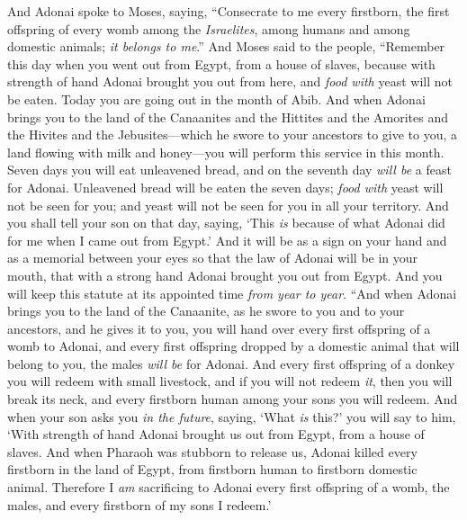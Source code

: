 \begin{biblechapter} %
 And Adonai spoke to Moses, saying,
\verse “Consecrate to me every firstborn, the first offspring of every womb among the \textit{Israelites}, among humans and among domestic animals; \textit{it belongs to me}.”
\verse And Moses said to the people, “Remember this day when you went out from Egypt, from a house of slaves, because with strength of hand Adonai brought you out from here, and \textit{food with} yeast will not be eaten.
\verse Today you are going out in the month of Abib.
\verse And when Adonai brings you to the land of the Canaanites and the Hittites and the Amorites and the Hivites and the Jebusites—which he swore to your ancestors to give to you, a land flowing with milk and honey—you will perform this service in this month.
\verse Seven days you will eat unleavened bread, and on the seventh day \textit{will be} a feast for Adonai.
\verse Unleavened bread will be eaten the seven days; \textit{food with} yeast will not be seen for you; and yeast will not be seen for you in all your territory.
\verse And you shall tell your son on that day, saying, ‘This \textit{is} because of what Adonai did for me when I came out from Egypt.’
\verse And it will be as a sign on your hand and as a memorial between your eyes so that the law of Adonai will be in your mouth, that with a strong hand Adonai brought you out from Egypt.
\verse And you will keep this statute at its appointed time \textit{from year to year}.
\verse “And when Adonai brings you to the land of the Canaanite, as he swore to you and to your ancestors, and he gives it to you,
\verse you will hand over every first offspring of a womb to Adonai, and every first offspring dropped by a domestic animal that will belong to you, the males \textit{will be} for Adonai.
\verse And every first offspring of a donkey you will redeem with small livestock, and if you will not redeem \textit{it}, then you will break its neck, and every firstborn human among your sons you will redeem.
\verse And when your son asks you \textit{in the future}, saying, ‘What \textit{is} this?’ you will say to him, ‘With strength of hand Adonai brought us out from Egypt, from a house of slaves.
\verse And when Pharaoh was stubborn to release us, Adonai killed every firstborn in the land of Egypt, from firstborn human to firstborn domestic animal. Therefore I \textit{am} sacrificing to Adonai every first offspring of a womb, the males, and every firstborn of my sons I redeem.’

\end{biblechapter}
